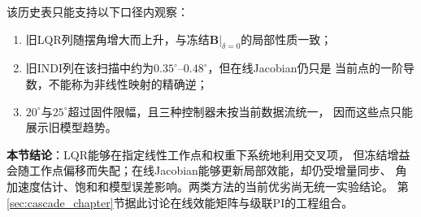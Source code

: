该历史表只能支持以下口径内观察：

\begin{enumerate}[label=(\arabic*)]
    \item 旧LQR列随摆角增大而上升，与冻结$\mathbf B|_{\delta=0}$的局部性质一致；
    \item 旧INDI列在该扫描中约为$0.35^\circ$--$0.48^\circ$，但在线Jacobian仍只是
          当前点的一阶导数，不能称为非线性映射的精确逆；
    \item $20^\circ$与$25^\circ$超过固件限幅，且三种控制器未按当前数据流统一，
          因而这些点只能展示旧模型趋势。
\end{enumerate}

\textbf{本节结论}：LQR能够在指定线性工作点和权重下系统地利用交叉项，
但冻结增益会随工作点偏移而失配；在线Jacobian能够更新局部效能，却仍受增量同步、
角加速度估计、饱和和模型误差影响。两类方法的当前优劣尚无统一实验结论。
第\ref{sec:cascade_chapter}节据此讨论在线效能矩阵与级联PI的工程组合。
